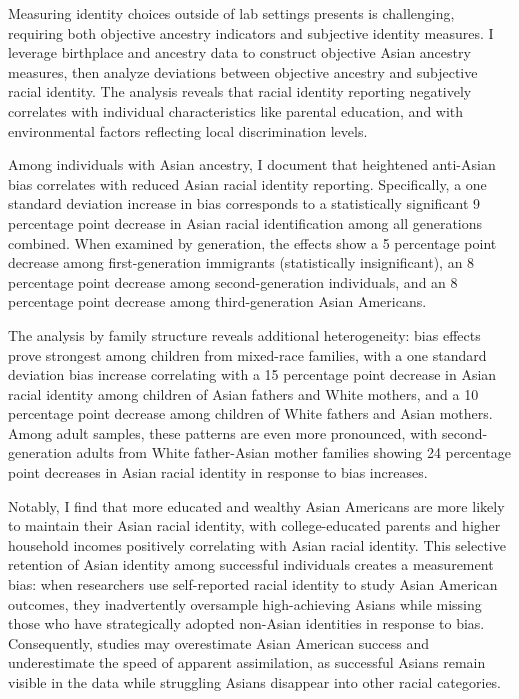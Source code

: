 Measuring identity choices outside of lab settings presents is challenging, requiring both objective ancestry indicators and subjective identity measures. I leverage birthplace and ancestry data to construct objective Asian ancestry measures, then analyze deviations between objective ancestry and subjective racial identity. The analysis reveals that racial identity reporting negatively correlates with individual characteristics like parental education, and with environmental factors reflecting local discrimination levels.

Among individuals with Asian ancestry, I document that heightened anti-Asian bias correlates with reduced Asian racial identity reporting. Specifically, a one standard deviation increase in bias corresponds to a statistically significant 9 percentage point decrease in Asian racial identification among all generations combined. When examined by generation, the effects show a 5 percentage point decrease among first-generation immigrants (statistically insignificant), an 8 percentage point decrease among second-generation individuals, and an 8 percentage point decrease among third-generation Asian Americans. 

The analysis by family structure reveals additional heterogeneity: bias effects prove strongest among children from mixed-race families, with a one standard deviation bias increase correlating with a 15 percentage point decrease in Asian racial identity among children of Asian fathers and White mothers, and a 10 percentage point decrease among children of White fathers and Asian mothers. Among adult samples, these patterns are even more pronounced, with second-generation adults from White father-Asian mother families showing 24 percentage point decreases in Asian racial identity in response to bias increases.

Notably, I find that more educated and wealthy Asian Americans are more likely to maintain their Asian racial identity, with college-educated parents and higher household incomes positively correlating with Asian racial identity. This selective retention of Asian identity among successful individuals creates a measurement bias: when researchers use self-reported racial identity to study Asian American outcomes, they inadvertently oversample high-achieving Asians while missing those who have strategically adopted non-Asian identities in response to bias. Consequently, studies may overestimate Asian American success and underestimate the speed of apparent assimilation, as successful Asians remain visible in the data while struggling Asians disappear into other racial categories.

